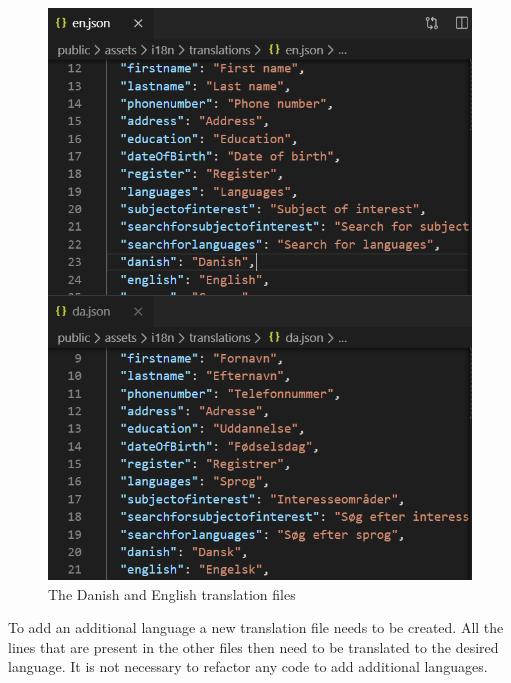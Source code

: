 \begin{figure}
    \centering
    \includegraphics[scale=0.5]{figures/translations.PNG}
    \caption{The Danish and English translation files}
    \label{fig:translationfiles}
\end{figure}
\noindent
To add an additional language a new translation file needs to be created. All the lines that are present in the other files then need to be translated to the desired language. 
It is not necessary to refactor any code to add additional languages.
